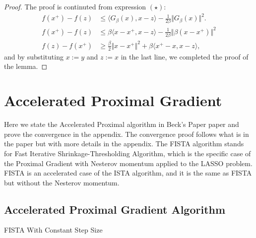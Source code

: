\documentclass[]{article}
\theoremstyle{definition}
\begin{document}
        \begin{proof}
            The proof is continuted from expression $(\star)$: 
            \begin{align*}
                f(x^+) - f(z) 
                &\le 
                \langle G_\beta(x), x - z\rangle - \frac{1}{2\beta}\Vert G_\beta(x)\Vert^2. 
                \\
                f(x^+) - f(z) & \le 
                \beta\langle x - x^+, x - z\rangle - \frac{1}{2\beta}\Vert \beta (x - x^+)\Vert^2
                \\
                f(z) - f(x^+) & \ge
                \frac{\beta}{2}\Vert x - x^+\Vert^2
                 + 
                \beta\langle x^+ - x, x - z\rangle, 
            \end{align*}
            and by substituting $x:=y$ and $z:= x$ in the last line, we completed the proof of the lemma. 
        \end{proof}

\section{Accelerated Proximal Gradient}\label{sec:apg_intro}
    Here we state the Accelerated Proximal algorithm in Beck's Paper paper\cite{paper:FISTA} and prove the convergence in the appendix. The convergence proof follows what is in the paper but with more details in the appendix. The FISTA algorithm stands for Fast Iterative Shrinkage-Thresholding Algorithm, which is the specific case of the Proximal Gradient with Nesterov momentum applied to the LASSO problem. FISTA is an accelerated case of the ISTA algorithm, and it is the same as FISTA but without the Nesterov momentum. 
    
    \subsection{Accelerated Proximal Gradient Algorithm} 
        \begin{algorithm}[H]\label{alg:fista_1} 
        \begin{algorithmic}[1]
                \ENDIF
            \ENDFOR
        \end{algorithmic}\caption{FISTA With Constant Step Size}
        \end{algorithm}
\end{document}
